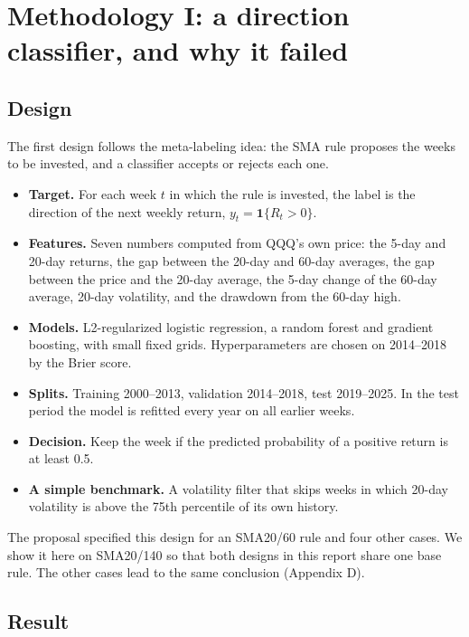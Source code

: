\documentclass[11pt]{article}
\providecommand{\tightlist}{\setlength{\itemsep}{2pt}\setlength{\parskip}{0pt}}
\begin{document}
\section{Methodology I: a direction classifier, and why it failed}

\subsection{Design}

The first design follows the meta-labeling idea: the SMA rule proposes the weeks to be invested, and a classifier accepts or rejects each one.

\begin{itemize}
\tightlist
\item
  \textbf{Target.} For each week \(t\) in which the rule is invested, the label is the direction of the next weekly return, \(y_t = \mathbf{1}\{R_t > 0\}\).
\item
  \textbf{Features.} Seven numbers computed from QQQ's own price: the 5-day and 20-day returns, the gap between the 20-day and 60-day averages, the gap between the price and the 20-day average, the 5-day change of the 60-day average, 20-day volatility, and the drawdown from the 60-day high.
\item
  \textbf{Models.} L2-regularized logistic regression, a random forest and gradient boosting, with small fixed grids. Hyperparameters are chosen on 2014--2018 by the Brier score.
\item
  \textbf{Splits.} Training 2000--2013, validation 2014--2018, test 2019--2025. In the test period the model is refitted every year on all earlier weeks.
\item
  \textbf{Decision.} Keep the week if the predicted probability of a positive return is at least 0.5.
\item
  \textbf{A simple benchmark.} A volatility filter that skips weeks in which 20-day volatility is above the 75th percentile of its own history.
\end{itemize}

The proposal specified this design for an SMA20/60 rule and four other cases. We show it here on SMA20/140 so that both designs in this report share one base rule. The other cases lead to the same conclusion (Appendix D).

\subsection{Result}
\end{document}
